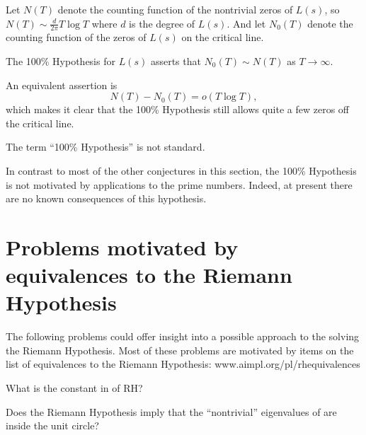 \documentclass[12pt,letterpaper, reqno]{amsart}
\begin{document}
\begin{problemblock}
Let $N(T)$ denote the counting function of the nontrivial
zeros of $L(s)$, so $N(T)\sim \frac{d}{2\pi}T\log T$
where $d$ is the degree of $L(s)$.  And let
$N_0(T)$ denote the counting function of the
zeros of $L(s)$ on the critical line.
\begin{problem}[2.8]
The 100\% Hypothesis for $L(s)$
asserts that $N_0(T)\sim N(T)$ as $T\to \infty$.
\end{problem}

\begin{distinguishedremark}
An equivalent assertion is
$$
N(T)- N_0(T) = o(T\log T) ,
$$
which makes it clear that the 100\% Hypothesis still
allows quite a few zeros off the critical line.
\end{distinguishedremark}

\begin{remark}
The term ``100\% Hypothesis'' is not standard.
\end{remark}

\begin{remark}
In contrast to most of the other conjectures in
this section, the 100\% Hypothesis is not motivated
by applications to the prime numbers.   
Indeed, at
present there are no known consequences of
this hypothesis.
\end{remark}

\end{problemblock}

\section{Problems motivated by equivalences to the Riemann Hypothesis}

The following problems could offer insight into a possible approach
to the solving the Riemann Hypothesis.  Most of these problems
are motivated by items on the 
list of equivalences to the Riemann Hypothesis:  www.aimpl.org/pl/rhequivalences

\begin{problemblock}
\begin{problem}[3.1]
What is the constant in 
 of RH?
\end{problem}
\end{problemblock}

\begin{problemblock}
\begin{problem}[3.2]
Does the Riemann Hypothesis imply that the ``nontrivial'' eigenvalues
of 
are inside the unit circle?
\end{problem}
\end{problemblock}
\end{document}
